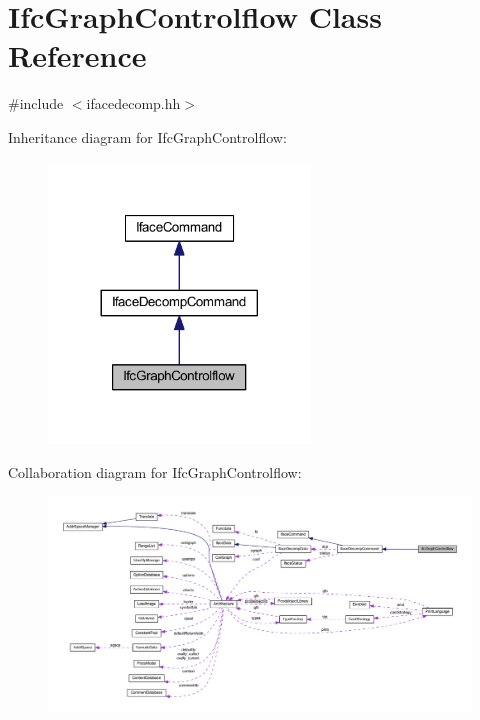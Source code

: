 \hypertarget{class_ifc_graph_controlflow}{}\section{Ifc\+Graph\+Controlflow Class Reference}
\label{class_ifc_graph_controlflow}


{\ttfamily \#include $<$ifacedecomp.\+hh$>$}



Inheritance diagram for Ifc\+Graph\+Controlflow\+:
\nopagebreak
\begin{figure}[H]
\begin{center}
\leavevmode
\includegraphics[width=197pt]{class_ifc_graph_controlflow__inherit__graph}
\end{center}
\end{figure}


Collaboration diagram for Ifc\+Graph\+Controlflow\+:
\nopagebreak
\begin{figure}[H]
\begin{center}
\leavevmode
\includegraphics[width=350pt]{class_ifc_graph_controlflow__coll__graph}
\end{center}
\end{figure}
